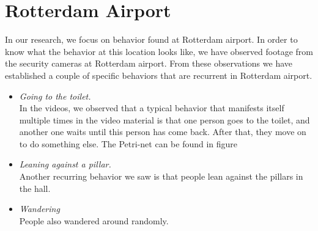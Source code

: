 \documentclass[11pt]{book}
\begin{document}
\section{Rotterdam Airport}
In our research, we focus on behavior found at Rotterdam airport. In order to know what the behavior at this location looks like, we have observed footage from the security cameras at Rotterdam airport. From these observations we have established a couple of specific behaviors that are recurrent in Rotterdam airport.

\begin{itemize}
\item \emph{Going to the toilet.}
\\In the videos, we observed that a typical behavior that manifests itself multiple times in the video material is that one person goes to the toilet, and another one waits until this person has come back. After that, they move on to do something else. The Petri-net can be found in figure

\item \emph{Leaning against a pillar.}
\\Another recurring behavior we saw is that people lean against the pillars in the hall. 

\item \emph{Wandering}\\
People also wandered around randomly.
\end{itemize}
\end{document}
